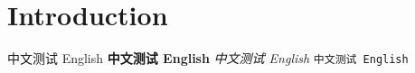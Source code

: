 \documentclass{ctexart}
\begin{document}

\section{Introduction}
中文测试 English
\textbf{中文测试 English}
\emph{中文测试 English}
\texttt{中文测试 English}
\end{document}

